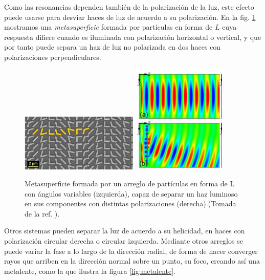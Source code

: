 \documentclass[12pt]{article}
\begin{document}
Como las resonancias dependen también de la polarización de la luz,
este efecto puede usarse para desviar haces de luz de acuerdo a su
polarización. En la fig. \ref{fig:metasup} mostramos una {\em
  metasuperficie} formada por partículas en forma de $L$ cuya
respuesta difiere cuando es iluminada con polarización horizontal o
vertical, y que por tanto puede
separa un haz de luz no polarizada en dos haces con polarizaciones
perpendiculares.
\begin{figure}
  \centering
  \includegraphics[width=0.5\textwidth,angle=90,valign=c]{fig12a}
  \includegraphics[width=0.4\textwidth,valign=c]{fig12b}
  \caption{Metasuperficie formada por un arreglo de partículas en
    forma de L con ángulos variables (izquierda), capaz de separar un
    haz luminoso en sus componentes con distintas polarizaciones
    (derecha).(Tomada de la ref. \cite{metasup}). }
  \label{fig:metasup}
\end{figure}
Otros sistemas pueden separar la luz de acuerdo a su helicidad, en
haces con polarización circular derecha o circular izquierda.
Mediante otros arreglos se puede variar la fase a lo largo de la
dirección radial, de forma de hacer converger rayos que arriben en la
dirección normal sobre un punto, su foco, creando así una metalente,
como la que ilustra la figura \ref{fig:metalente}.
\end{document}
